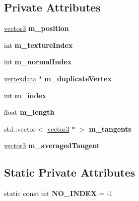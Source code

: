 \subsection*{Private Attributes}
\begin{DoxyCompactItemize}
\item 
\mbox{\label{classflounder_1_1vertexdata_a2724e76a7939b58a9cfc4a06f4ed2e49}} 
\hyperlink{classflounder_1_1vector3}{vector3} {\bfseries m\+\_\+position}
\item 
\mbox{\label{classflounder_1_1vertexdata_a2e1bbe8132aee676c2c0f591c22add25}} 
int {\bfseries m\+\_\+texture\+Index}
\item 
\mbox{\label{classflounder_1_1vertexdata_a7dabb349ae805c1c4f724b31fbbdd8f2}} 
int {\bfseries m\+\_\+normal\+Index}
\item 
\mbox{\label{classflounder_1_1vertexdata_a75c4ade5f2d6376a8526b95a9959d84a}} 
\hyperlink{classflounder_1_1vertexdata}{vertexdata} $\ast$ {\bfseries m\+\_\+duplicate\+Vertex}
\item 
\mbox{\label{classflounder_1_1vertexdata_a456182b8e51af2bef2482bcca993731c}} 
int {\bfseries m\+\_\+index}
\item 
\mbox{\label{classflounder_1_1vertexdata_a7b4695e3e683c6b6217b8dd5ff40ce8d}} 
float {\bfseries m\+\_\+length}
\item 
\mbox{\label{classflounder_1_1vertexdata_a7494c4e657be36b6940881952fea9a1d}} 
std\+::vector$<$ \hyperlink{classflounder_1_1vector3}{vector3} $\ast$ $>$ {\bfseries m\+\_\+tangents}
\item 
\mbox{\label{classflounder_1_1vertexdata_a774e65a9dd054cff7284cfaf3577dcd6}} 
\hyperlink{classflounder_1_1vector3}{vector3} {\bfseries m\+\_\+averaged\+Tangent}
\end{DoxyCompactItemize}
\subsection*{Static Private Attributes}
\begin{DoxyCompactItemize}
\item 
\mbox{\label{classflounder_1_1vertexdata_aedc69c8a9ed41f18f62a91481c737d75}} 
static const int {\bfseries N\+O\+\_\+\+I\+N\+D\+EX} = -\/1
\end{DoxyCompactItemize}


